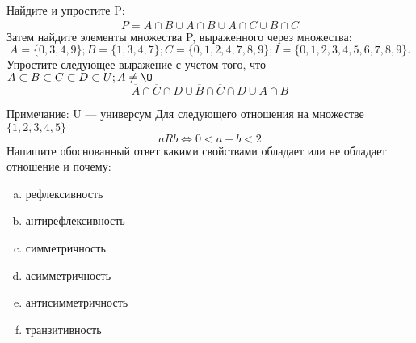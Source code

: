 \documentclass[10pt]{exam}
\begin{document}
\begin{questions}
\question
Найдите и упростите P:
\begin{equation*}
\overline{P} = A \cap B \cup \overline{A} \cap \overline{B} \cup A \cap C \cup \overline{B} \cap C
\end{equation*}
Затем найдите элементы множества P, выраженного через множества:
\begin{equation*}
A = \{0, 3, 4, 9\}; 
B = \{1, 3, 4, 7\};
C = \{0, 1, 2, 4, 7, 8, 9\};
I = \{0, 1, 2, 3, 4, 5, 6, 7, 8, 9\}.
\end{equation*}\question
Упростите следующее выражение с учетом того, что $A\subset B \subset C \subset D \subset U; A \neq \O$
\begin{equation*}
\overline{A} \cap \overline{C} \cap D \cup \overline{B} \cap \overline{C} \cap D \cup A \cap B
\end{equation*}

Примечание: U — универсум\question
Для следующего отношения на множестве $\{1, 2, 3, 4, 5\}$ 
\begin{equation*}
aRb \iff 0 < a-b<2
\end{equation*}
Напишите обоснованный ответ какими свойствами обладает или не обладает отношение и почему:   
\begin{enumerate} [a)]\setcounter{enumi}{0}
\item рефлексивность
\item антирефлексивность
\item симметричность
\item асимметричность
\item антисимметричность
\item транзитивность
\end{enumerate}


\end{questions}
\end{document}
